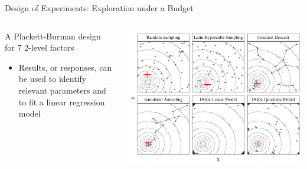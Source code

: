 \documentclass[11pt, compress, aspectratio=169, xcolor={table,usenames,dvipsnames}]{beamer}
\begin{document}
\begin{frame}
\begin{columns}
\begin{column}{0.89\columnwidth}
\begin{columns}
\begin{column}[t]{0.48\columnwidth}
\begin{block}{Design of Experiments: Exploration under a Budget}
\vspace{1em}
\begin{columns}
\begin{column}{0.39\columnwidth}
{\scriptsize

}
\begin{center}
{\tiny
A \alert{Plackett-Burman} design \\[-0.5em] for \alert{7 2-level factors}
}
\end{center}
\vspace{0.2em}
\begin{itemize}
\item \alert{Results}, or \alert{responses}, can be used to
identify \alert{relevant parameters} and to \alert{fit a linear regression
model}
\end{itemize}
\end{column}
\begin{column}{0.59\columnwidth}
\begin{center}
\begin{center}
\includegraphics[width=0.98\columnwidth]{../../../img/sampling_comparison.pdf}
\end{center}
\end{center}


\end{column}
\end{columns}
\end{block}
\end{column}
\end{columns}
\end{column}
\end{columns}
\end{frame}
\end{document}
